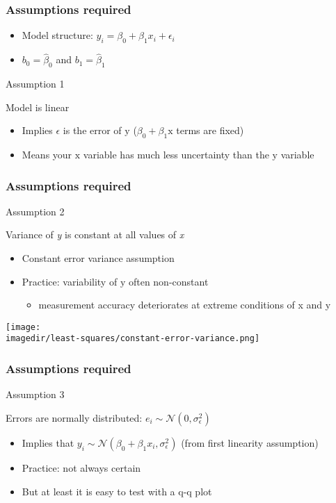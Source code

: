 \begin{frame}\frametitle{Assumptions required}
	\begin{itemize}
		\item	Model structure: $y_i = \beta_0 + \beta_1 x_i + \epsilon_i$
		\item	$b_0 = \hat{\beta}_0$ and $b_1= \hat{\beta}_1$
	\end{itemize}
	\begin{block}
		{Assumption 1}
		\begin{center}
			Model is linear
		\end{center}
	\end{block}
	\begin{itemize}
		\item	Implies $\epsilon$ is the error of $\mathrm{y}$ ($\beta_0 + \beta_1 \mathrm{x}$ terms are fixed)
		\item	Means your $\mathrm{x}$ variable has much less uncertainty than the $\mathrm{y}$ variable
	\end{itemize}
\end{frame}

\begin{frame}\frametitle{Assumptions required}
	\begin{block}
		{Assumption 2}
		\begin{center}
			Variance of \emph{y} is constant at all values of \emph{x}
		\end{center}
	\end{block}
	\begin{itemize}
		\item	Constant error variance assumption
		\item	Practice: variability of $\mathrm{y}$ often non-constant
		\begin{itemize}
			\item	measurement accuracy deteriorates at extreme conditions of x and y
		\end{itemize}
	\end{itemize}
	\begin{center}
		\texttt{[image: \\imagedir/least-squares/constant-error-variance.png]}
	\end{center}
\end{frame}

\begin{frame}\frametitle{Assumptions required}
	\begin{block}
		{Assumption 3}
		\begin{center}
			Errors are normally distributed: $e_i \sim \mathcal{N}(0, \sigma_\epsilon^2)$
		\end{center}
	\end{block}
	\begin{itemize}
		\item	Implies that $y_i \sim \mathcal{N}(\beta_0 + \beta_1x_i, \sigma_\epsilon^2)$ (from first linearity assumption)
		\item	Practice: not always certain
		\item	But at least it is easy to test with a q-q plot
	\end{itemize}
\end{frame}

